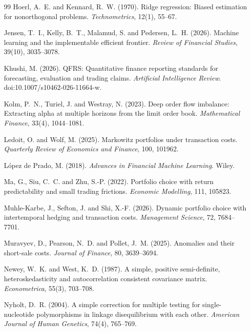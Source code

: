 \documentclass[11pt]{article}
\begin{document}
\begin{thebibliography}{99}
Hoerl, A.\ E. and Kennard, R.\ W. (1970).
Ridge regression: Biased estimation for nonorthogonal problems.
\emph{Technometrics}, 12(1), 55--67.

Jensen, T.\ I., Kelly, B.\ T., Malamud, S. and Pedersen, L.\ H. (2026).
Machine learning and the implementable efficient frontier.
\emph{Review of Financial Studies}, 39(10), 3035--3078.

Khushi, M. (2026).
QFRS: Quantitative finance reporting standards for forecasting, evaluation and trading claims.
\emph{Artificial Intelligence Review}.
doi:10.1007/s10462-026-11664-w.

Kolm, P.\ N., Turiel, J. and Westray, N. (2023).
Deep order flow imbalance: Extracting alpha at multiple horizons from the limit order book.
\emph{Mathematical Finance}, 33(4), 1044--1081.

Ledoit, O. and Wolf, M. (2025).
Markowitz portfolios under transaction costs.
\emph{Quarterly Review of Economics and Finance}, 100, 101962.

L\'opez de Prado, M. (2018).
\emph{Advances in Financial Machine Learning}.
Wiley.

Ma, G., Siu, C.\ C. and Zhu, S.-P. (2022).
Portfolio choice with return predictability and small trading frictions.
\emph{Economic Modelling}, 111, 105823.

Muhle-Karbe, J., Sefton, J. and Shi, X.-F. (2026).
Dynamic portfolio choice with intertemporal hedging and transaction costs.
\emph{Management Science}, 72, 7684--7701.

Muravyev, D., Pearson, N.\ D. and Pollet, J.\ M. (2025).
Anomalies and their short-sale costs.
\emph{Journal of Finance}, 80, 3639--3694.

Newey, W.\ K. and West, K.\ D. (1987).
A simple, positive semi-definite, heteroskedasticity and autocorrelation consistent covariance matrix.
\emph{Econometrica}, 55(3), 703--708.

Nyholt, D.\ R. (2004).
A simple correction for multiple testing for single-nucleotide polymorphisms in linkage disequilibrium with each other.
\emph{American Journal of Human Genetics}, 74(4), 765--769.


\end{thebibliography}
\end{document}
